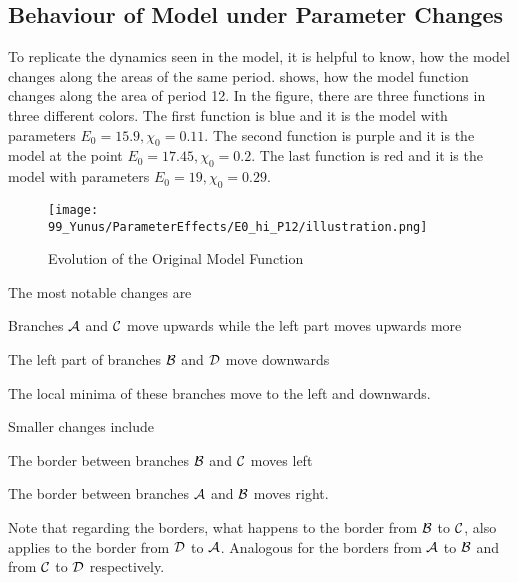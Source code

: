 \subsection{Behaviour of Model under Parameter Changes}
\label{sec:og.param.effects}

To replicate the dynamics seen in the model, it is helpful to know, how the model changes along the areas of the same period.
 shows, how the model function changes along the area of period 12.
In the figure, there are three functions in three different colors.
The first function is blue and it is the model with parameters $E_0 = 15.9, \chi_0 = 0.11$.
The second function is purple and it is the model at the point $E_0 = 17.45, \chi_0 = 0.2$.
The last function is red and it is the model with parameters $E_0 = 19, \chi_0 = 0.29$.

\begin{figure}
    \centering
    \texttt{[image: 99\_Yunus/ParameterEffects/E0\_hi\_P12/illustration.png]}
    \caption{Evolution of the Original Model Function}
    \label{fig:yunus.function.evolution}
\end{figure}

The most notable changes are
\begin{enumerate*}
    \item Branches $\mathcal{A}$ and $\mathcal{C}$ move upwards while the left part moves upwards more
    \item The left part of branches $\mathcal{B}$ and $\mathcal{D}$ move downwards 
    \item The local minima of these branches move to the left and downwards.
\end{enumerate*}
Smaller changes include
\begin{enumerate*}
    \item The border between branches $\mathcal{B}$ and $\mathcal{C}$ moves left
    \item The border between branches $\mathcal{A}$ and $\mathcal{B}$ moves right.
\end{enumerate*}
Note that regarding the borders, what happens to the border from $\mathcal{B}$ to $\mathcal{C}$, also applies to the border from $\mathcal{D}$ to $\mathcal{A}$.
Analogous for the borders from $\mathcal{A}$ to $\mathcal{B}$ and from $\mathcal{C}$ to $\mathcal{D}$ respectively.
